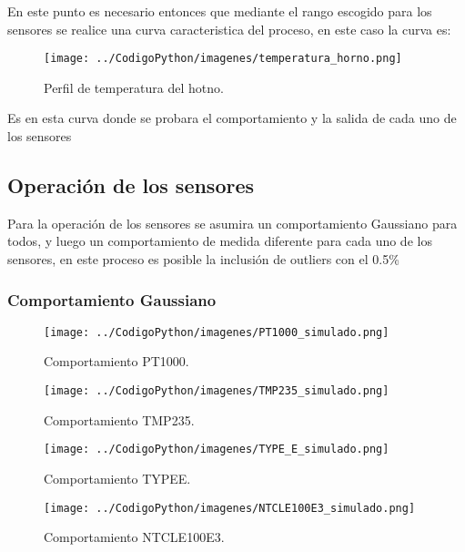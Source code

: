 \documentclass[conference]{IEEEtran}
\begin{document}
En este punto es necesario entonces que mediante el rango escogido para los sensores se realice una curva caracteristica del proceso, en este caso la curva es:


\begin{figure}[h!]
	\centering
	\texttt{[image: ../CodigoPython/imagenes/temperatura\_horno.png]}
	\caption{Perfil de temperatura del hotno.}
	\label{fig:5}
\end{figure}

Es en esta curva donde se probara el comportamiento y la salida de cada uno de los sensores

\subsection{Operación de los sensores}

Para la operación de los sensores se asumira un comportamiento Gaussiano para todos, y luego un comportamiento de medida diferente para cada uno de los sensores, en este proceso es posible la inclusión de outliers con el 0.5\%

\subsubsection{Comportamiento Gaussiano}

\begin{figure}[h!]
	\centering
	\texttt{[image: ../CodigoPython/imagenes/PT1000\_simulado.png]}
	\caption{Comportamiento PT1000.}
	\label{fig:PT1000_simulado}
\end{figure}

\begin{figure}[h!]
	\centering
	\texttt{[image: ../CodigoPython/imagenes/TMP235\_simulado.png]}
	\caption{Comportamiento TMP235.}
	\label{fig:TMP235_simulado}
\end{figure}

\begin{figure}[h!]
	\centering
	\texttt{[image: ../CodigoPython/imagenes/TYPE\_E\_simulado.png]}
	\caption{Comportamiento TYPEE.}
	\label{fig:TYPE_E_simulado}
\end{figure}

\begin{figure}[h!]
	\centering
	\texttt{[image: ../CodigoPython/imagenes/NTCLE100E3\_simulado.png]}
	\caption{Comportamiento NTCLE100E3.}
	\label{fig:NTCLE100E3_simulado}
\end{figure}
\end{document}
